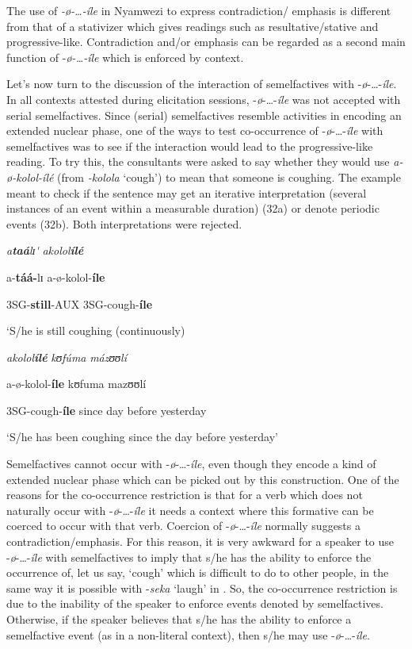 \documentclass[output=paper]{langscibook}
\begin{document}
The use of \textit{-ø}\textit{-…-íle} in Nyamwezi to express contradiction/ emphasis is different from that of a stativizer which gives readings such as resultative/stative and progressive-like. Contradiction and/or emphasis can be regarded as a second main function of -\textit{ø-…-íle} which is enforced by context. 

Let’s now turn to the discussion of the interaction of semelfactives with -\textit{ø}-…-\textit{íle}. In all contexts attested during elicitation sessions, -\textit{ø}-…-\textit{íle} was not accepted with serial semelfactives. Since (serial) semelfactives resemble activities in encoding an extended nuclear phase, one of the ways to test co-occurrence of -\textit{ø}-…-\textit{íle} with semelfactives was to see if the interaction would lead to the progressive-like reading. To try this, the consultants were asked to say whether they would use \textit{a-ø}\textit{-kolol-ílé} (from \textit{-kolola} ‘cough’) to mean that someone is coughing. The example meant to check if the sentence may get an iterative interpretation (several instances of an event within a measurable duration) (32a) or denote periodic events (32b). Both interpretations were rejected. 

\ea
\ea  *\textit{a}\textbf{\textit{taá}}\textit{lɪ}\textit{\'{} }              \textit{akolol}\textbf{\textit{ílé}}

      a-\textbf{táá-}lɪ            a-ø-kolol-\textbf{íle}

      3SG-\textbf{still}-AUX 3SG-cough-\textbf{íle}

      ‘S/he is still coughing (continuously)



\ex  *\textit{akolol}\textbf{\textit{ílé} }         \textit{kʊ}\textit{fúma} \textit{mázʊʊ}\textit{lí}

      a-ø-kolol-\textbf{íle}    kʊfuma mazʊʊlí

      3SG-cough-\textbf{íle} since     day before yesterday

      
    ‘S/he has been coughing since the day before yesterday’
\z
\z


  Semelfactives cannot occur with -\textit{ø}-…-\textit{íle}, even though they encode a kind of extended nuclear phase which can be picked out by this construction. One of the reasons for the co-occurrence restriction is that for a verb which does not naturally occur with -\textit{ø}-…-\textit{íle} it needs a context where this formative can be coerced to occur with that verb. Coercion of -\textit{ø}-…-\textit{íle} normally suggests a contradiction/emphasis. For this reason, it is very awkward for a speaker to use -\textit{ø}-…-\textit{íle} with semelfactives to imply that s/he has the ability to enforce the occurrence of, let us say, ‘cough’ which is difficult to do to other people, in the same way it is possible with -\textit{seka} ‘laugh’ in . So, the co-occurrence restriction is due to the inability of the speaker to enforce events denoted by semelfactives. Otherwise, if the speaker believes that s/he has the ability to enforce a semelfactive event (as in a non-literal context), then s/he may use -\textit{ø}-…-\textit{íle}. 
\end{document}
